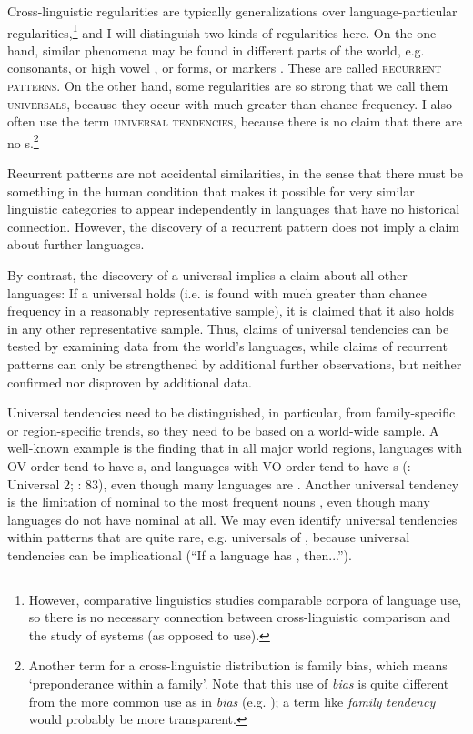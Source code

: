 \documentclass[output=paper]{langsci/langscibook}
\begin{document}
Cross-linguistic regularities are typically generalizations over language-par\-tic\-u\-lar regularities,\footnote{However, comparative  linguistics studies comparable corpora of language use, so there is no necessary connection between cross-linguistic comparison and the study of systems (as opposed to use).} and I will distinguish two kinds of regularities here. On the one hand, similar phenomena may be found in different parts of the world, e.g.  consonants, or high vowel , or   forms, or  markers \citep{Creissels2014}. These are called \textsc{recurrent patterns}. On the other hand, some regularities are so strong that we call them \textsc{universals}, because they occur with much greater than chance frequency. I also often use the term \textsc{universal tendencies}, because there is no claim that there are no s.\footnote{Another term for a cross-linguistic distribution is  family bias, which means ‘preponderance within a family’. Note that this use of \textit{bias} is quite different from the more common use as in \textit{ bias} (e.g. \citealt{TverskyKahneman1974}); a term like \textit{family tendency} would probably be more transparent.}
\largerpage[2]

Recurrent patterns are not accidental similarities, in the sense that there must be something in the human condition that makes it possible for very similar linguistic categories to appear independently in languages that have no historical connection. However, the discovery of a recurrent pattern does not imply a claim about further languages.

By contrast, the discovery of a universal implies a claim about all other languages: If a universal holds (i.e. is found with much greater than chance frequency in a reasonably representative sample), it is claimed that it also holds in any other representative sample. Thus, claims of universal tendencies can be tested by examining data from the world’s languages, while claims of recurrent patterns can only be strengthened by additional further observations, but neither confirmed nor disproven by additional data. 

Universal tendencies need to be distinguished, in particular, from family-spe\-cif\-ic or region-specific trends, so they need to be based on a world-wide sample. A well-known example is the finding that in all major world regions, languages with OV order tend to have s, and languages with VO order tend to have s (\citealt{Greenberg1963}: Universal 2; \citealt{Dryer1992}: 83), even though many languages are . Another universal tendency is the limitation of nominal  to the most frequent nouns \citep{Vafaeian2013}, even though many languages do not have nominal  at all. We may even identify universal tendencies within patterns that are quite rare, e.g. universals of  \citep{Yu2007}, because universal tendencies can be implicational (“If a language has , then...”).
\end{document}
